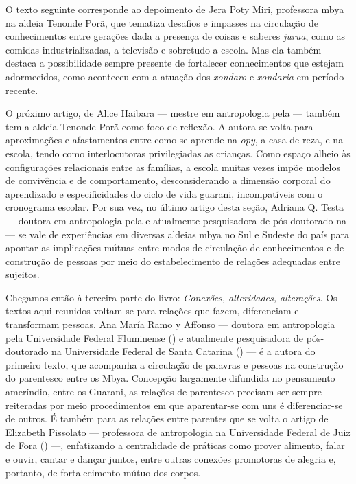 O texto seguinte corresponde ao depoimento de Jera Poty Miri, professora
mbya na aldeia Tenonde Porã, que tematiza desafios e impasses na
circulação de conhecimentos entre gerações dada a presença de coisas e
saberes \emph{jurua}, como as comidas industrializadas, a televisão e
sobretudo a escola. Mas ela também destaca a possibilidade sempre
presente de fortalecer conhecimentos que estejam adormecidos, como
aconteceu com a atuação dos \emph{xondaro} e \emph{xondaria} em período recente. 

O próximo artigo, de Alice Haibara --- mestre em antropologia pela  ---
também tem a aldeia Tenonde Porã como foco de reflexão. A autora se
volta para aproximações e afastamentos entre como se aprende na \emph{opy}, a
casa de reza, e na escola, tendo como interlocutoras privilegiadas as
crianças. Como espaço alheio às configurações relacionais entre as
famílias, a escola muitas vezes impõe modelos de convivência e de
comportamento, desconsiderando a dimensão corporal do aprendizado e
especificidades do ciclo de vida guarani, incompatíveis com o
cronograma escolar. Por sua vez, no último artigo desta seção, Adriana
Q. Testa --- doutora em antropologia pela  e atualmente pesquisadora
de pós-doutorado na  --- se vale de experiências em diversas
aldeias mbya no Sul e Sudeste do país para apontar as implicações
mútuas entre modos de circulação de conhecimentos e de construção de
pessoas por meio do estabelecimento de relações adequadas entre
sujeitos. 

Chegamos então à terceira parte do livro: \emph{Conexões, alteridades,
alterações}. Os textos aqui reunidos voltam-se para relações que fazem,
diferenciam e transformam pessoas. Ana María Ramo y Affonso --- doutora
em antropologia pela Universidade Federal Fluminense () e atualmente
pesquisadora de pós-doutorado na Universidade Federal de Santa Catarina
()  --- é a autora do primeiro texto, que acompanha a circulação de
palavras e pessoas na construção do parentesco entre os Mbya. Concepção
largamente difundida no pensamento ameríndio, entre os Guarani, as relações
de parentesco precisam ser sempre reiteradas por meio procedimentos em
que aparentar-se com uns é diferenciar-se de outros. É também para as
relações entre parentes que se volta o artigo de Elizabeth Pissolato ---
professora de antropologia na Universidade Federal de Juiz de Fora
() ---, enfatizando a centralidade de práticas como prover alimento,
falar e ouvir, cantar e dançar juntos, entre outras conexões promotoras
de alegria e, portanto, de fortalecimento mútuo dos corpos.

